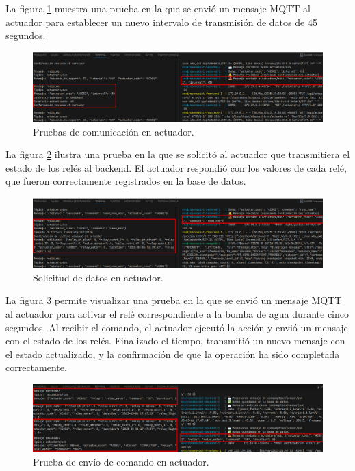 La figura \ref{fig:prueba_mqtt_actuador_1} muestra una prueba en la que se
envió un mensaje MQTT al actuador para establecer un nuevo intervalo de
transmisión de datos de 45 segundos.

\begin{figure}[H]
    \centering
    \includegraphics[width=\textwidth]{Images/58_prueba_mqtt_actuador_1.png}
    \caption[Pruebas de comunicación en actuador]{Pruebas de comunicación en actuador.}
    \label{fig:prueba_mqtt_actuador_1}
\end{figure}

La figura \ref{fig:prueba_mqtt_actuador_2} ilustra una prueba en la que se
solicitó al actuador que transmitiera el estado de los relés al backend. El
actuador respondió con los valores de cada relé, que fueron correctamente
registrados en la base de datos.

\begin{figure}[H]
    \centering
    \includegraphics[width=\textwidth]{Images/58_prueba_mqtt_actuador_2.png}
    \caption[Solicitud de datos en actuador]{Solicitud de datos en actuador.}
    \label{fig:prueba_mqtt_actuador_2}
\end{figure}

La figura \ref{fig:prueba_mqtt_actuador_3} permite visualizar una prueba en la
que se envió un mensaje MQTT al actuador para activar el relé correspondiente a
la bomba de agua durante cinco segundos. Al recibir el comando, el actuador
ejecutó la acción y envió un mensaje con el estado de los relés. Finalizado el
tiempo, transmitió un nuevo mensaje con el estado actualizado, y la
confirmación de que la operación ha sido completada correctamente.

\begin{figure}[H]
    \centering
    \includegraphics[width=\textwidth]{Images/58_prueba_mqtt_actuador_3.png}
    \caption[Envío de comando en actuador]{Prueba de envío de comando en actuador.}
    \label{fig:prueba_mqtt_actuador_3}
\end{figure}

